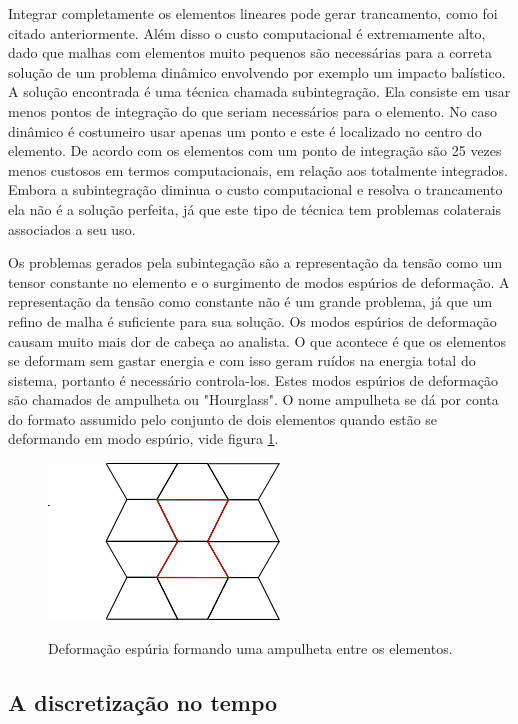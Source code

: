 Integrar completamente os elementos lineares pode gerar trancamento, como foi citado anteriormente. Além disso o custo computacional é extremamente alto, dado que malhas com elementos muito pequenos são necessárias para a correta solução de um problema dinâmico envolvendo por exemplo um impacto balístico. A solução encontrada é uma técnica chamada subintegração. Ela consiste em usar menos pontos de integração do que seriam necessários para o elemento. No caso dinâmico é costumeiro usar apenas um ponto e este é localizado no centro do elemento. De acordo com \cite{theorymanls} os elementos com um ponto de integração são 25 vezes menos custosos em termos computacionais, em relação aos totalmente integrados. Embora a subintegração diminua o custo computacional e resolva o trancamento ela não é a solução perfeita, já que este tipo de técnica tem problemas colaterais associados a seu uso. \par

Os problemas gerados pela subintegação são a representação da tensão como um tensor constante no elemento e o surgimento de modos espúrios de deformação. A representação da tensão como constante não é um grande problema, já que um refino de malha é suficiente para sua solução. Os modos espúrios de deformação causam muito mais dor de cabeça ao analista. O que acontece é que os elementos se deformam sem gastar energia e com isso geram ruídos na energia total do sistema, portanto é necessário controla-los. Estes modos espúrios de deformação são chamados de ampulheta ou "Hourglass". O nome ampulheta se dá por conta do formato assumido pelo conjunto de dois elementos quando estão se deformando em modo espúrio, vide figura \ref{fig:hourglass}. 

\begin{figure}
    \centering
    \caption{Deformação espúria formando uma ampulheta entre os elementos.}
    \includegraphics[width=0.5\linewidth]{images/hourglass.png}
    \label{fig:hourglass}
\end{figure}

\subsection{A discretização no tempo}

